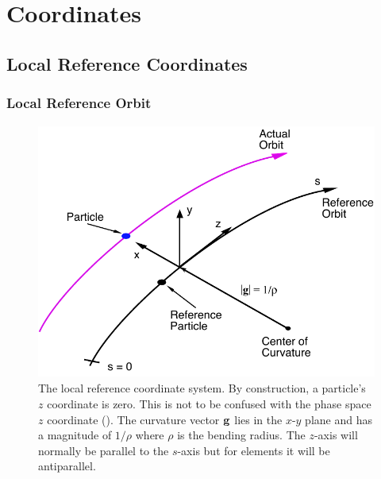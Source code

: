 \chapter{Coordinates}

\section{Local Reference Coordinates}
\label{s:local.coords}

\subsection{Local Reference Orbit}
\label{s:ref}

\begin{figure}[!b]
  \centering
  \includegraphics[height=8.4cm]{local-coords.pdf}
  \caption[The local Reference System.]
{The local reference coordinate system. By construction, a particle's
$z$ coordinate is zero.  This is not to be confused with the phase
space $z$ coordinate (). The curvature vector
${\bf g}$ lies in the $x$-$y$ plane and has a magnitude of $1/\rho$ where
$\rho$ is the bending radius. The $z$-axis will normally be parallel
to the $s$-axis but for  elements it will be antiparallel.
}
  \label{f:local.coords}
\end{figure}

